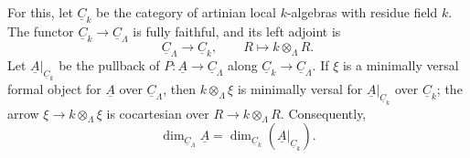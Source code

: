 For this, let $\underline C_k$ be the category of artinian local
$k$-algebras with residue field $k$. The functor
$\underline C_k\longrightarrow\underline C_\Lambda$ is fully
faithful, and its left adjoint is
\[
 \underline C_\Lambda\longrightarrow\underline C_k,
 \qquad R\longmapsto k\otimes_\Lambda R.
\]
Let $\underline A|_{\underline C_k}$ be the pullback of
$P:\underline A\longrightarrow\underline C_\Lambda$ along
$\underline C_k\longrightarrow\underline C_\Lambda$. If $\xi$ is a
minimally versal formal object for $\underline A$ over
$\underline C_\Lambda$, then $k\otimes_\Lambda\xi$ is minimally
versal for $\underline A|_{\underline C_k}$ over $\underline C_k$;
the arrow $\xi\longrightarrow k\otimes_\Lambda\xi$ is cocartesian
over $R\longrightarrow k\otimes_\Lambda R$. Consequently,
\[
 \dim_{\underline C_\Lambda}\underline A
 =\dim_{\underline C_k}(\underline A|_{\underline C_k}).
\]
